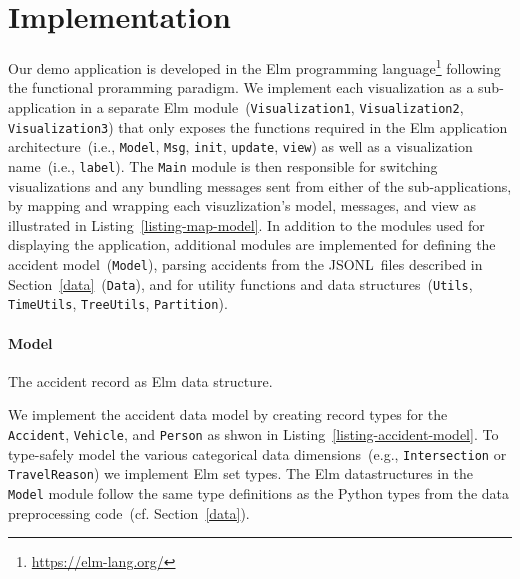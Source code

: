 \section{Implementation}
\label{implementation}
\begin{listing}
    
    \caption{Example of wrapping the \lstinline{update} function from \lstinline{Visualization1} inside the \lstinline{Main} module's \lstinline{update} function. Commands sent from \lstinline{Visualization1} are then mapped to the \lstinline{Main} modules types.}
    \label{listing-map-model}
\end{listing}
Our demo application is developed in the Elm programming language\footnote{\url{https://elm-lang.org/}} following the functional proramming paradigm. We implement each visualization as a sub-application in a separate Elm module~(\lstinline{Visualization1}, \lstinline{Visualization2}, \lstinline{Visualization3}) that only exposes the functions required in the Elm application architecture~(i.e., \lstinline{Model}, \lstinline{Msg}, \lstinline{init}, \lstinline{update}, \lstinline{view}) as well as a visualization name~(i.e., \lstinline{label}). The \lstinline{Main} module is then responsible for switching visualizations and any bundling messages sent from either of the sub-applications, by mapping and wrapping each visuzlization's model, messages, and view as illustrated in Listing~\ref{listing-map-model}. In addition to the modules used for displaying the application, additional modules are implemented for defining the accident model~(\lstinline{Model}), parsing accidents from the JSONL~files described in Section~\ref{data}~(\lstinline{Data}), and for utility functions and data structures~(\lstinline{Utils}, \lstinline{TimeUtils}, \lstinline{TreeUtils}, \lstinline{Partition}).

\paragraph{Model}
\begin{listing}
    
    \caption{The accident record as Elm data structure.}
    \label{listing-accident-model}
\end{listing}
We implement the accident data model by creating record types for the \lstinline[breaklines=false]{Accident}, \lstinline{Vehicle}, and \lstinline{Person} as shwon in Listing~\ref{listing-accident-model}. To type-safely model the various categorical data dimensions~(e.g., \lstinline{Intersection} or \lstinline{TravelReason}) we implement Elm set types. The Elm datastructures in the \lstinline{Model} module follow the same type definitions as the Python types from the data preprocessing code~(cf. Section~\ref{data}).

